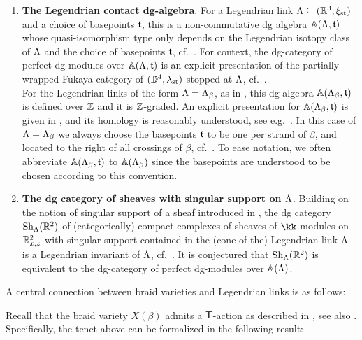 \begin{enumerate}
    \item {\bf The Legendrian contact dg-algebra}. For a Legendrian link $\La\sse(\R^3,\xi_\std)$ and a choice of basepoints $\tt$, this is a non-commutative dg algebra $\mathbb{A}(\La,\tt)$ whose quasi-isomorphism type only depends on the Legendrian isotopy class of $\La$ and the choice of basepoints $\tt$, cf.~\cite{Chekanov,EtnyreNg22_Survey}. For context, the dg-category of perfect dg-modules over $\mathbb{A}(\La,\tt)$ is an explicit presentation of the partially wrapped Fukaya category of $(\D^4,\la_\std)$ stopped at $\La$, cf.~\cite{EkholmLekili2023}.\\
    
    For the Legendrian links of the form $\La=\La_\beta$, as in , this dg algebra $\mathbb{A}(\La_\beta,\tt)$ is defined over $\Z$ and it is $\Z$-graded. An explicit presentation for $\mathbb{A}(\La_\beta,\tt)$ is given in \cite[Section 5.1]{CasalsNg22}, and its homology is reasonably understood, see e.g.~\cite[Corollary 1.1]{casals2026vanishinghigherlegendrianhomology}. In this case of $\La=\La_\beta$ we always choose the basepoints $\tt$ to be one per strand of $\beta$, and located to the right of all crossings of $\beta$, cf.~\cite[Section 5]{CasalsNg22}. To ease notation, we often abbreviate $\mathbb{A}(\La_\beta,\tt)$ to $\mathbb{A}(\La_\beta)$ since the basepoints are understood to be chosen according to this convention.\\

    \item {\bf The dg category of sheaves with singular support on $\La$}. Building on the notion of singular support of a sheaf introduced in \cite{KashiwaraSchapira_Book}, the dg category $\operatorname{Sh}_\La(\R^2)$ of (categorically) compact complexes of sheaves of $\kk$-modules on $\R^2_{x,z}$ with singular support contained in the (cone of the) Legendrian link $\La$ is a Legendrian invariant of $\La$, cf.~\cite{GKS_Quantization}. It is conjectured that $\operatorname{Sh}_\La(\R^2)$ is equivalent to the dg-category of perfect dg-modules over $\mathbb{A}(\La)$.\\
\end{enumerate}

A central connection between braid varieties and Legendrian links is as follows:\\

\begin{center}
\end{center}
\vspace{0.1cm}
\noindent Recall that the braid variety $X(\beta)$ admits a $\T$-action as described in , see also . Specifically, the tenet above can be formalized in the following result:

